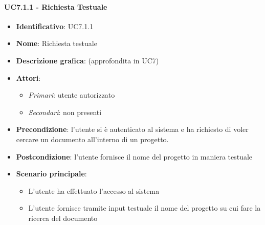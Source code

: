 \paragraph{UC7.1.1 - Richiesta Testuale}
\begin{itemize}
   \item \textbf{Identificativo}: UC7.1.1
   \item \textbf{Nome}: Richiesta testuale
   \item \textbf{Descrizione grafica}: (approfondita in UC7)
   \item \textbf{Attori}:
   \begin{itemize} 
       \item \textit{Primari}: utente autorizzato
       \item \textit{Secondari}: non presenti
   \end{itemize}
       \item \textbf{Precondizione}: l'utente si è autenticato al sistema e ha richiesto di voler cercare un documento all'interno di un progetto.
       \item \textbf{Postcondizione}: l'utente fornisce il nome del progetto in maniera testuale
    \item \textbf{Scenario principale}: 
       \begin{itemize}
           \item L'utente ha effettuato l'accesso al sistema 
           \item L'utente fornisce tramite input testuale il nome del progetto su cui fare la ricerca del documento
       \end{itemize}
\end{itemize}

